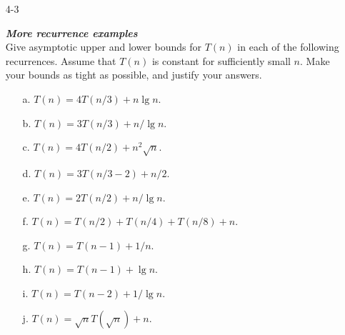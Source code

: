 \begin{enumerate}
\newpage

\item[4{-}3]{\textbf{\emph{More recurrence examples}}\\
Give asymptotic upper and lower bounds for $T(n)$ in each of the following
recurrences. Assume that $T(n)$ is constant for sufficiently small $n$. Make
your bounds as tight as possible, and justify your answers.

\begin{enumerate}
  \item[a.] $T(n) = 4T(n/3) + n \lg n$.
  \item[b.] $T(n) = 3T(n/3) + n / \lg n$.
  \item[c.] $T(n) = 4T(n/2) + n^2 \sqrt n$.
  \item[d.] $T(n) = 3T(n/3 - 2) + n/2$.
  \item[e.] $T(n) = 2T(n/2) + n / \lg n$.
  \item[f.] $T(n) = T(n/2) + T(n/4) + T(n/8) + n$.
  \item[g.] $T(n) = T(n - 1) + 1/n$.
  \item[h.] $T(n) = T(n - 1) + \lg n$.
  \item[i.] $T(n) = T(n - 2) + 1 / \lg n$.
  \item[j.] $T(n) = \sqrt n T(\sqrt n) + n$.
\end{enumerate}
}


\end{enumerate}

